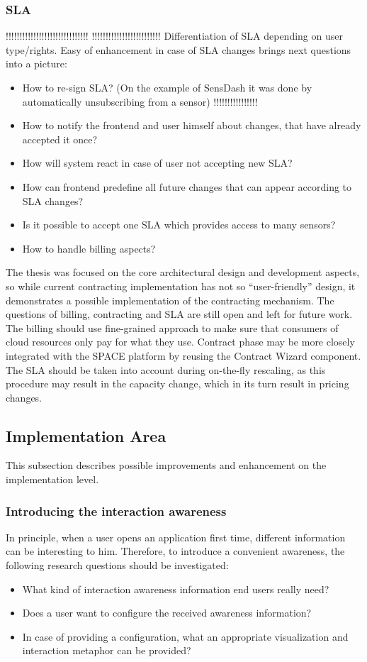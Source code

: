\subsubsection {SLA}
!!!!!!!!!!!!!!!!!!!!!!!!!!!!!!
!!!!!!!!!!!!!!!!!!!!!!!!!
Differentiation of SLA depending on user type/rights. Easy of enhancement in case of SLA changes brings next questions into a picture: 
  \begin{itemize}
  \item How to re-sign SLA? (On the example of SensDash it was done by automatically unsubscribing from a sensor)
  !!!!!!!!!!!!!!!! \item How to notify the frontend and user himself about changes, that have already accepted it once?
  \item How will system react in case of user not accepting new SLA?
  \item How can frontend predefine all future changes that can appear according to SLA changes?
  \item Is it possible to accept one SLA which provides access to many sensors?
  \item How to handle billing aspects?
  \end{itemize}

The thesis was focused on the core architectural design and development aspects, so while current contracting implementation has not so ``user-friendly'' design, it demonstrates a possible implementation of the contracting mechanism. The questions of billing, contracting and SLA are still open and left for future work. The billing should use fine-grained approach to make sure that consumers of cloud resources only pay for what they use. Contract phase may be more closely integrated with the SPACE platform by reusing the Contract Wizard component. The SLA should be taken into account during on-the-fly rescaling, as this procedure may result in the capacity change, which in its turn result in pricing changes. 

\subsection{Implementation Area}
This subsection describes possible improvements and enhancement on the implementation level.

\subsubsection {Introducing the interaction awareness}
In principle, when a user opens an application first time, different information can be interesting to him. Therefore, to introduce a convenient awareness, the following research questions should be investigated:
 \begin{itemize}
\item What kind of interaction awareness information end users really need?
\item Does a user want to configure the received awareness information?
\item In case of providing a configuration, what an appropriate visualization and interaction metaphor can be provided? 
\end{itemize}

